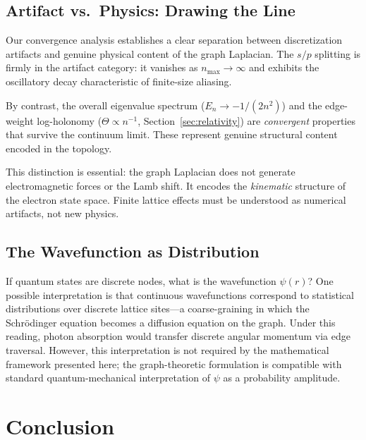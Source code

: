 \documentclass[aps,pra,twocolumn,superscriptaddress,longbibliography]{revtex4-2}
\begin{document}
\subsection{Artifact vs.\ Physics: Drawing the Line}

Our convergence analysis establishes a clear separation between
discretization artifacts and genuine physical content of the graph
Laplacian. The $s/p$ splitting is firmly in the artifact category:
it vanishes as $n_{\max} \to \infty$ and exhibits the oscillatory
decay characteristic of finite-size aliasing.

By contrast, the overall eigenvalue spectrum
($E_n \to -1/(2n^2)$) and the edge-weight log-holonomy
($\Theta \propto n^{-1}$, Section~\ref{sec:relativity}) are
\emph{convergent} properties that survive the continuum limit.
These represent genuine structural content encoded in the topology.

This distinction is essential: the graph Laplacian does not generate
electromagnetic forces or the Lamb shift. It encodes the
\textit{kinematic} structure of the electron state space. Finite
lattice effects must be understood as numerical artifacts, not
new physics.

\subsection{The Wavefunction as Distribution}

If quantum states are discrete nodes, what is the wavefunction $\psi(r)$? One possible interpretation is that continuous wavefunctions correspond to statistical distributions over discrete lattice sites---a coarse-graining in which the Schr\"odinger equation becomes a diffusion equation on the graph. Under this reading, photon absorption would transfer discrete angular momentum via edge traversal. However, this interpretation is not required by the mathematical framework presented here; the graph-theoretic formulation is compatible with standard quantum-mechanical interpretation of $\psi$ as a probability amplitude.


\section{Conclusion}
\label{sec:conclusion}
\end{document}

